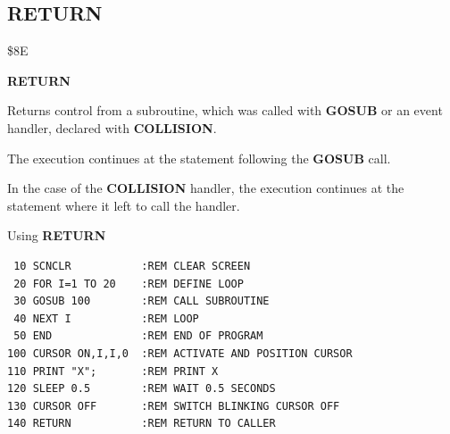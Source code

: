 \subsection{RETURN}
\begin{description}[leftmargin=2cm,style=nextline]
\item [Token:] \$8E
\item [Format:] {\bf RETURN}
\item [Usage:]  Returns control from a subroutine, which
                was called with {\bf GOSUB} or an event
                handler, declared with {\bf COLLISION}.

                The execution continues at the statement
                following the {\bf GOSUB} call.

                In the case of the {\bf COLLISION} handler,
                the execution continues at the statement
                where it left to call the handler.

\item [Example:] Using {\bf RETURN}

\begin{tcolorbox}[colback=black,coltext=white]
\verbatimfont{\codefont}
\begin{verbatim}
 10 SCNCLR           :REM CLEAR SCREEN
 20 FOR I=1 TO 20    :REM DEFINE LOOP
 30 GOSUB 100        :REM CALL SUBROUTINE
 40 NEXT I           :REM LOOP
 50 END              :REM END OF PROGRAM
100 CURSOR ON,I,I,0  :REM ACTIVATE AND POSITION CURSOR
110 PRINT "X";       :REM PRINT X
120 SLEEP 0.5        :REM WAIT 0.5 SECONDS
130 CURSOR OFF       :REM SWITCH BLINKING CURSOR OFF
140 RETURN           :REM RETURN TO CALLER
\end{verbatim}
\end{tcolorbox}
\end{description}


\newpage
